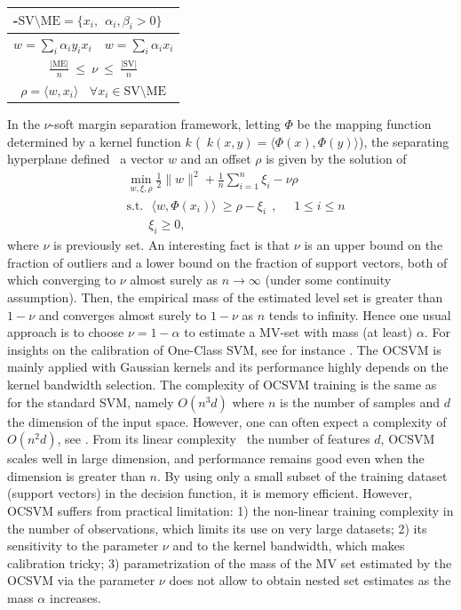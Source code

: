 \begin{table}[!ht]
{\begin{tabular}{cc}
    \multicolumn{2}{l}{-$\text{SV} \setminus \text{ME} = \{ x_i,~~ \alpha_i, \beta_i > 0\}$ }\\ \midrule %
    $w = \sum_i \alpha_i y_i x_i$                                                                   & $w = \sum_i \alpha_i x_i$  \\ \midrule %
    \multicolumn{2}{c}{ $\displaystyle \frac{|\text{ME}|}{n} ~\le~ \nu ~\le~ \frac{|\text{SV}|}{n}$ }   \\
    \multicolumn{2}{c}{$\displaystyle \rho = \langle w, x_i\rangle ~~~~\forall x_i \in \text{SV} \setminus \text{ME}$} \\ \bottomrule %
  \end{tabular}
}
\end{table}
\renewcommand{\arraystretch}{1.1}

In the $\nu$-soft margin separation framework, letting $\Phi$ be the mapping function determined by a kernel function $k$ (\ie~$k(x,y) = \langle \Phi(x), \Phi(y)\rangle$), the separating hyperplane defined \wrt~a vector $w$ and an offset $\rho$ is given by the solution of 
\begin{align*}
&\min_{w,\xi,\rho} \frac{1}{2} \|w\|^2 + \frac{1}{n} \sum_{i=1}^n \xi_i - \nu \rho\\
&\text{s.t.}~~~ \langle w, \Phi(x_i)\rangle ~\ge \rho - \xi_i~~,~~~~~~1 \le i \le n \\
& ~~~~~~~~\xi_i \ge 0,
\end{align*}
where $\nu$ is previously set. An interesting fact is that $\nu$ is an upper bound on the fraction of outliers and a lower bound on the fraction of support vectors, both of which converging to $\nu$ almost surely as $n \to \infty$ (under some continuity assumption). Then, the empirical mass of the estimated level set is greater than $1-\nu$ and converges almost surely to $1-\nu$ as $n$ tends to infinity. Hence one usual approach is to choose $\nu = 1 - \alpha$ to estimate a MV-set with mass (at least) $\alpha$. For insights on the calibration of One-Class SVM, see for instance \cite{Thomas2015}.
%
The OCSVM is mainly applied with Gaussian kernels and its performance highly depends on the kernel bandwidth selection.
The complexity of OCSVM training is the same as for the standard SVM, namely $O(n^3 d)$ where $n$ is the number of samples and $d$ the dimension of the input space. However, one can often expect a complexity of $O(n^2 d)$, see \cite{Bottou2007}. From its linear complexity \wrt~the number of features $d$, OCSVM scales well in large dimension, and performance remains good even when the dimension is greater than $n$. By using only a small subset of the training dataset (support vectors) in the decision function, it is memory efficient. However, OCSVM suffers from practical limitation: 1) the non-linear training complexity in the number of observations, which limits its use on very large datasets; 2) its sensitivity to the parameter $\nu$ and to the kernel bandwidth, which makes calibration tricky; 3) parametrization of the mass of the MV set estimated by the OCSVM via the parameter $\nu$ does not allow to obtain nested set estimates as the mass $\alpha$ increases.

